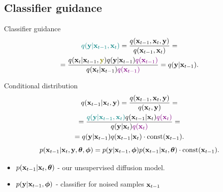 \subsection{Classifier guidance}
\begin{frame}{Classifier guidance}
	\vspace{-0.5cm}
	\begin{multline*}
		{\color{teal}q(\by | \bx_{t - 1}, \bx_t)} = \frac{q(\bx_{t - 1}, \bx_t, \by)}{q(\bx_{t - 1}, \bx_t)} = \\
		= \frac{q(\bx_t | \bx_{t - 1}, {\color{olive}\by}) q(\by | \bx_{t - 1}) \color{violet}{q(\bx_{t - 1})}} {q(\bx_t | \bx_{t - 1}) \color{violet}{q(\bx_{t - 1})}} = q(\by | \bx_{t - 1}).
	\end{multline*}
	\vspace{-0.4cm}
	\begin{block}{Conditional distribution}
		\vspace{-0.7cm}
		\begin{multline*}
			q(\mathbf{x}_{t - 1} | \mathbf{x}_t, \mathbf{y}) = \frac{q(\mathbf{x}_{t - 1}, \mathbf{x}_t, \mathbf{y})}{q(\mathbf{x}_t, \mathbf{y})}  = \\ 
			=  \frac{{\color{teal}q(\mathbf{y} | \mathbf{x}_{t - 1}, \mathbf{x}_t)} q(\mathbf{x}_{t - 1} | \mathbf{x}_t) {\color{violet}q(\mathbf{x}_t)}}{q(\mathbf{y} | \mathbf{x}_t) {\color{violet}q(\mathbf{x}_t)}} = \\
			= q(\mathbf{y} | \mathbf{x}_{t - 1}) q(\mathbf{x}_{t - 1} | \mathbf{x}_t) \cdot \text{const}(\mathbf{x}_{t - 1}).
		\end{multline*}
		\[
			p(\mathbf{x}_{t - 1} | \mathbf{x}_t, \mathbf{y}, \boldsymbol{\theta} , \boldsymbol{\phi}) = p(\mathbf{y} | \mathbf{x}_{t-1}, \boldsymbol{\phi}) p(\mathbf{x}_{t-1} | \mathbf{x}_t, \boldsymbol{\theta}) \cdot \text{const}(\mathbf{x}_{t - 1}).
		\]
		\vspace{-0.4cm}
		\begin{itemize}
			\item $p(\mathbf{x}_{t-1} | \mathbf{x}_t, \boldsymbol{\theta})$ - our unsupervised diffusion model.
			\item $p(\mathbf{y} | \mathbf{x}_{t-1}, \boldsymbol{\phi})$ - classifier for noised samples $\mathbf{x}_{t-1}$
		\end{itemize}
	\end{block}
\end{frame}
